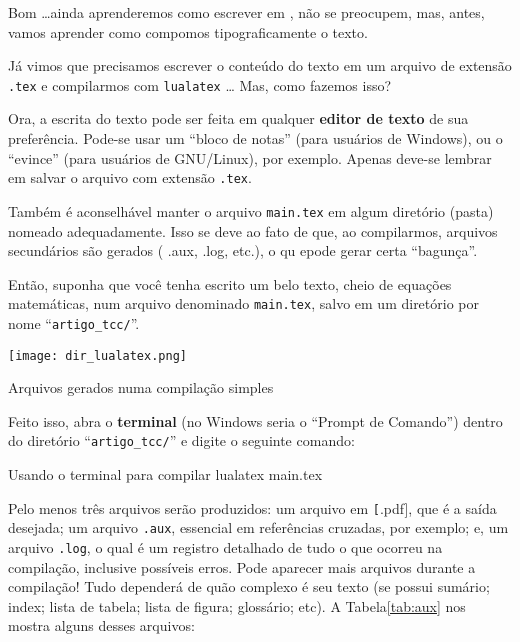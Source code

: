 Bom \ldots ainda aprenderemos como escrever em , não se preocupem,
mas, antes, vamos aprender como compomos tipograficamente o texto.

Já vimos que precisamos escrever o conteúdo do texto em um arquivo de extensão
\texttt{.tex} e compilarmos com \texttt{lualatex} \ldots 
Mas, como fazemos isso?

Ora, a escrita do texto pode ser feita em qualquer \textbf{editor de texto} de 
sua preferência.
Pode-se usar um ``bloco de notas'' (para usuários de Windows), ou o ``evince'' (para
usuários de GNU/Linux), por exemplo.
Apenas deve-se lembrar em salvar o arquivo com extensão \texttt{.tex}.

Também é aconselhável manter o arquivo \texttt{main.tex} em algum diretório (pasta) 
nomeado adequadamente.
Isso se deve ao fato de que, ao compilarmos, arquivos secundários são gerados (
.aux, .log, etc.), o qu epode gerar certa ``bagunça''.

Então, suponha que você tenha escrito um belo texto, cheio de equações matemáticas,
num arquivo denominado \texttt{main.tex}, salvo em um diretório por nome 
``\texttt{artigo\_tcc/}''.
\begin{marginfigure}
  \centering
  \texttt{[image: dir\_lualatex.png]}
  \caption{Arquivos gerados numa compilação simples}
\end{marginfigure}
Feito isso, abra o \textbf{terminal} (no Windows seria o ``Prompt de Comando'') 
dentro do diretório ``\texttt{artigo\_tcc/}'' e digite o seguinte comando:

\begin{codigo}{Usando o terminal para compilar}{\lapis}
  lualatex main.tex
\end{codigo}

Pelo menos três arquivos serão produzidos: um arquivo em \texttt[.pdf], que é a 
saída desejada; um arquivo \texttt{.aux}, essencial em referências cruzadas, por 
exemplo; e, um arquivo \texttt{.log}, o qual é um registro detalhado de tudo o que
ocorreu na compilação, inclusive possíveis erros.
Pode aparecer mais arquivos durante a compilação!
Tudo dependerá de quão complexo é seu texto (se possui sumário; index; lista de tabela;
lista de figura; glossário; etc).
A Tabela\ref{tab:aux} nos mostra alguns desses arquivos:

